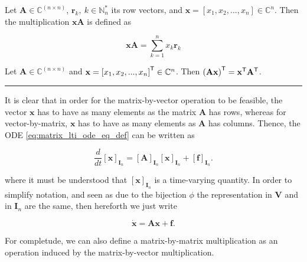 \begin{definition}\label{def:vectorbymatrix} Let $\mathbf{A}\in\mathbb{C}^{(n\times n)}$, $\mathbf{r}_k,\ k\in\mathbb{N}^*_n$ its row vectors, and $\mathbf{x} = \left[x_1,x_2,...,x_n\right]\in\mathbb{C}^n$. Then the multiplication $\mathbf{xA}$ is defined as

\begin{equation} \mathbf{xA} = \sum_{k=1}^n x_k\mathbf{r}_k \end{equation}
\end{definition}
\begin{theorem}\label{theo:vector_trasnp} Let $\mathbf{A}\in\mathbb{C}^{(n\times n)}$ and $\mathbf{x} = \left[x_1,x_2,...,x_n\right]^{\mathsf{T}}\in\mathbb{C}^n$. Then $\left(\mathbf{Ax}\right)^{\mathsf{T}} = \mathbf{x}^{\mathsf{T}}\mathbf{A}^{\mathsf{T}}$.
\end{theorem}
\hrule
\vspace{3mm}

	It is clear that in order for the matrix-by-vector operation to be feasible, the vector $\mathbf{x}$ has to have as many elements as the matrix $\mathbf{A}$ has rows, whereas for vector-by-matrix, $\mathbf{x}$ has to have as many elements as $\mathbf{A}$ has columns. Thence, the ODE \eqref{eq:matrix_lti_ode_eq_def} can be written as

\begin{equation} \dfrac{d}{dt} \left[\mathbf{x} \right]_{\mathbf{I}_n} = \left[\mathbf{A}\right]_{\mathbf{I}_n}\left[\mathbf{x}\right]_{\mathbf{I}_n} + \left[\mathbf{f}\right]_{\mathbf{I}_n} . \label{eq:equivalent_lti_ode_operator} \end{equation}

	\noindent where it must be understood that $\left[\mathbf{x} \right]_{\mathbf{I}_n}$ is a time-varying quantity. In order to simplify notation, and seen as due to the bijection $\phi$ the representation in $\mathbf{V}$ and in $\mathbf{I}_n$ are the same, then hereforth we just write


\begin{equation} \dot{\mathbf{x}} = \mathbf{Ax} + \mathbf{f} . \label{eq:equivalent_lti_ode_operator} \end{equation}

	For completude, we can also define a matrix-by-matrix multiplication as an operation induced by the matrix-by-vector multiplication.


